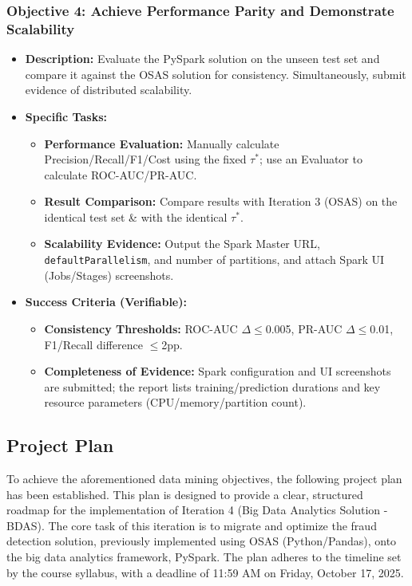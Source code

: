 \documentclass[sigplan,screen]{acmart}
\begin{document}
\subsubsection{Objective 4: Achieve Performance Parity and Demonstrate Scalability}

\begin{itemize}
\item \textbf{Description:} Evaluate the PySpark solution on the unseen test set and compare it against the OSAS solution for consistency. Simultaneously, submit evidence of distributed scalability.
\item \textbf{Specific Tasks:}
\begin{itemize}
\item \textbf{Performance Evaluation:} Manually calculate Precision/Recall/F1/Cost using the fixed $\tau^*$; use an Evalu\allowbreak ator to calculate ROC-AUC/PR-AUC.
\item \textbf{Result Comparison:} Compare results with Iteration 3 (OSAS) on the identical test set \& with the identical $\tau^*$.
\item \textbf{Scalability Evidence:} Output the Spark Master URL, \texttt{default\-Parallelism}, and number of partitions, and attach Spark UI (Jobs/Stages) screenshots.
\end{itemize}
\item \textbf{Success Criteria (Verifiable):}
\begin{itemize}
\item \textbf{Consistency Thresholds:} ROC-AUC $\Delta\leq$0.005, PR-AUC $\Delta\leq$0.01, F1/Recall difference $\leq$2pp.
\item \textbf{Completeness of Evidence:} Spark configuration and UI screenshots are submitted; the report lists training/prediction durations and key resource parameters (CPU/memory/partition count).
\end{itemize}
\end{itemize}

\subsection{Project Plan}

To achieve the aforementioned data mining objectives, the following project plan has been established. This plan is designed to provide a clear, structured roadmap for the implementation of Iteration 4 (Big Data Analytics Solution - BDAS). The core task of this iteration is to migrate and optimize the fraud detection solution, previously implemented using OSAS (Python/Pandas), onto the big data analytics framework, PySpark. The plan adheres to the timeline set by the course syllabus, with a deadline of 11:59 AM on Friday, October 17, 2025.
\end{document}
